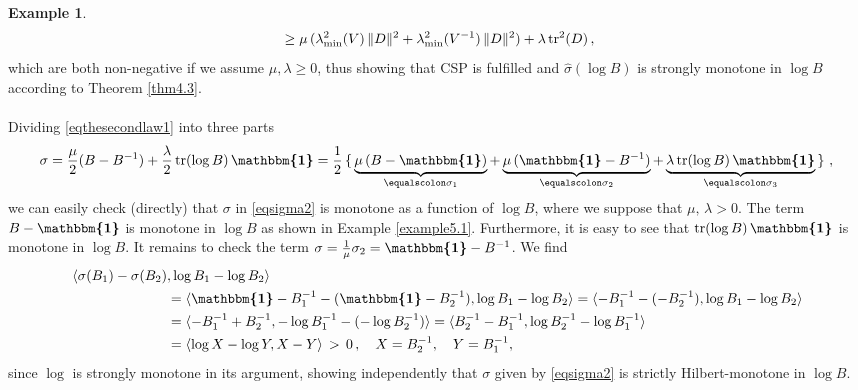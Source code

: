 \documentclass[10pt]{article}
\newcounter{theoremCounter}
\numberwithin{theoremCounter}{section}
\theoremstyle{plain}
\theoremstyle{definition}
\newtheorem{example}[theoremCounter]{Example}
\newcommand{\id}{{\boldsymbol{\mathbbm{1}}}}
\newcommand{\norm}[1]{\lVert #1 \rVert}
\DeclareMathOperator{\tr}{tr}
\def\tr{\textnormal{tr}}
\numberwithin{equation}{section}
\begin{document}
\begin{example}
\begin{equation}
\begin{alignedat}{2}
	&\ge \mu \, (\lambda_{\min}^2(V) \, \norm{D}^2 + \lambda_{\min}^2(V^{-1}) \, \norm{D}^2) + \lambda \, \tr^2(D)\,,
	\end{alignedat}
	\end{equation}
which are both non-negative if we assume $\mu, \lambda \ge 0$, thus showing that CSP is fulfilled and $\widehat \sigma(\log B)$ is strongly monotone in $\log B$ according to Theorem \ref{thm4.3}. \\
\\
Dividing \eqref{eqthesecondlaw1} into three parts
	\begin{align}
	\label{eqsigma2}
	\sigma = \frac{\mu}{2} (B - B^{-1}) + \frac{\lambda}{2} \, \tr(\log B) \, \id = \frac12 \left\{\, \smash{\underbrace{\mu \, (B-\id)}_{\equalscolon \sigma_1} + \underbrace{\mu \, (\id-B^{-1})}_{\equalscolon \sigma_2} + \underbrace{\lambda \, \tr(\log B) \, \id}_{\equalscolon\sigma_3}} \,\right\}\,,
	\vphantom{\underbrace{\mu \, (\id-B^{-1})}_{\equalscolon \sigma_2} + \underbrace{\lambda \, \tr(\log B) \, \id}_{\equalscolon\sigma_3}}
	\end{align}
we can easily check (directly) that $\sigma$ in \eqref{eqsigma2} is monotone as a function of $\log B$, where we suppose that $\mu, \, \lambda > 0$. The term $B - \id$ is monotone in $\log B$ as shown in Example \ref{example5.1}. Furthermore, it is easy to see that $\tr(\log B) \, \id$ is monotone in $\log B$. It remains to check the term $\sigma = \frac{1}{\mu} \sigma_2 = \id - B^{-1}$. We find
	\begin{equation}
	\begin{alignedat}{2}
	\langle \sigma(B_1) - \sigma(B_2)&, \log B_1 - \log B_2 \rangle \\
	&= \langle \id - B_1^{-1} - (\id - B_2^{-1}), \log B_1 - \log B_2 \rangle = \langle -B_1^{-1} - (-B_2^{-1}), \log B_1 - \log B_2 \rangle \\
	&= \langle -B_1^{-1} + B_2^{-1} , - \log B_1^{-1} - (-\log B_2^{-1}) \rangle = \langle B_2^{-1} - B_1^{-1} , \log B_2^{-1} - \log B_1^{-1} \rangle \\
	&= \langle \log X - \log Y, X - Y \rangle \,>\, 0\,, \quad X=B_2^{-1}, \quad Y = B_1^{-1},
	\end{alignedat}
	\end{equation}
since $\log$ is strongly monotone in its argument, showing independently that $\sigma$ given by \eqref{eqsigma2} is strictly Hilbert-monotone in $\log B$.
\end{example}
\end{document}
